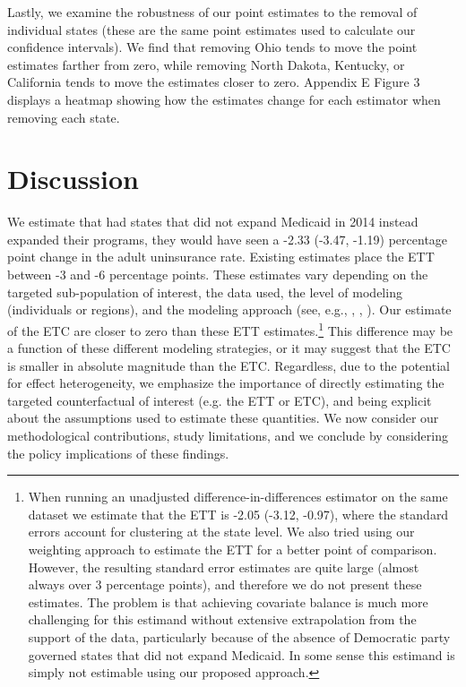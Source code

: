 \documentclass[aoas]{imsart}
\theoremstyle{plain}
\theoremstyle{remark}
\begin{document}
Lastly, we examine the robustness of our point estimates to the removal of individual states (these are the same point estimates used to calculate our confidence intervals). We find that removing Ohio tends to move the point estimates farther from zero, while removing North Dakota, Kentucky, or California tends to move the estimates closer to zero. Appendix E Figure 3 displays a heatmap showing how the estimates change for each estimator when removing each state.

\section{Discussion}

We estimate that had states that did not expand Medicaid in 2014 instead expanded their programs, they would have seen a -2.33 (-3.47, -1.19) percentage point change in the adult uninsurance rate. Existing estimates place the ETT between -3 and -6 percentage points. These estimates vary depending on the targeted sub-population of interest, the data used, the level of modeling (individuals or regions), and the modeling approach (see, e.g., \cite{courtemanche2017early}, \cite{kaestner2017effects}, \cite{frean2017premium}). Our estimate of the ETC are closer to zero than these ETT estimates.\footnote{When running an unadjusted difference-in-differences estimator on the same dataset we estimate that the ETT is -2.05 (-3.12, -0.97), where the standard errors account for clustering at the state level. We also tried using our weighting approach to estimate the ETT for a better point of comparison. However, the resulting standard error estimates are quite large (almost always over 3 percentage points), and therefore we do not present these estimates. The problem is that achieving covariate balance is much more challenging for this estimand without extensive extrapolation from the support of the data, particularly because of the absence of Democratic party governed states that did not expand Medicaid. In some sense this estimand is simply not estimable using our proposed approach.} This difference may be a function of these different modeling strategies, or it may suggest that the ETC is smaller in absolute magnitude than the ETC. Regardless, due to the potential for effect heterogeneity, we emphasize the importance of directly estimating the targeted counterfactual of interest (e.g. the ETT or ETC), and being explicit about the assumptions used to estimate these quantities. We now consider our methodological contributions, study limitations, and we conclude by considering the policy implications of these findings.
\end{document}
